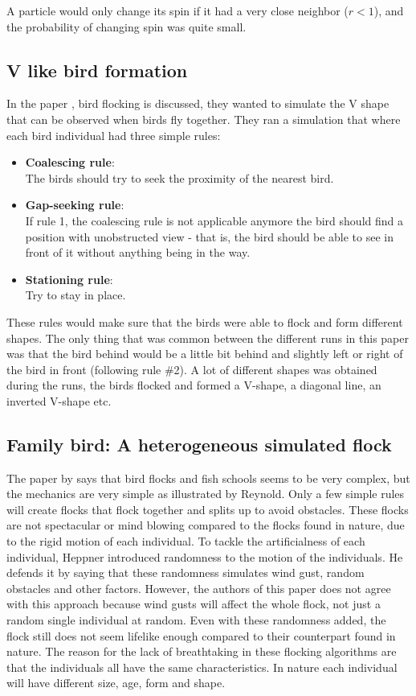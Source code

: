 A particle would only change its spin if it had a very close neighbor ($r<1$), and the probability of changing spin was quite small.

\subsection{V like bird formation}
In the paper \citep{Nathan2008}, bird flocking is discussed, they wanted to simulate the V shape that can be observed when birds fly together. They ran a simulation that where each bird individual had three simple rules: 
\begin{itemize}
    \item \textbf{Coalescing rule}: \\
        The birds should try to seek the proximity of the nearest bird.
    \item \textbf{Gap-seeking rule}: \\
        If rule 1, the coalescing rule is not applicable anymore the bird should find a position with unobstructed view -  that is, the bird should be able to see in front of it without anything being in the way.
    \item \textbf{Stationing rule}: \\
        Try to stay in place.
\end{itemize}
These rules would make sure that the birds were able to flock and form different shapes. The only thing that was common between the different runs in this paper was that the bird behind would be a little bit behind and slightly left or right of the bird in front (following rule \#2). A lot of different shapes was obtained during the runs, the birds flocked and formed a V-shape, a diagonal line, an inverted V-shape etc.

\subsection{Family bird: A heterogeneous simulated flock}
The paper \citep{Demsar2013} by \citeauthor{Demsar2013} says that bird flocks and fish schools seems to be very complex, but the mechanics are very simple as illustrated by Reynold. Only a few simple rules will create flocks that flock together and splits up to avoid obstacles. These flocks are not spectacular or mind blowing compared to the flocks found in nature, due to the rigid motion of each individual. To tackle the artificialness of each individual, Heppner introduced randomness to the motion of the individuals. He defends it by saying that these randomness simulates wind gust, random obstacles and other factors. 
However, the authors of this paper does not agree with this approach because wind gusts will affect the whole flock, not just a random single individual at random. Even with these randomness added, the flock still does not seem lifelike enough compared to their counterpart found in nature. The reason for the lack of breathtaking in these flocking algorithms are that the individuals all have the same characteristics. In nature each individual will have different size, age, form and shape.
 

